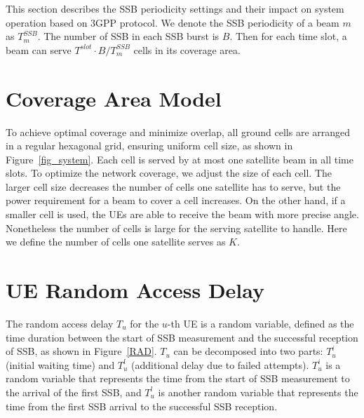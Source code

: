 This section describes the SSB periodicity settings and their impact on system operation based on 3GPP protocol. We denote the SSB periodicity of a beam $m$ as $T^{SSB}_m$. The number of SSB in each SSB burst is $B$. Then for each time slot, a beam can serve $T^{slot} \cdot B / T^{SSB}_m$ cells in its coverage area.

\section{Coverage Area Model}

To achieve optimal coverage and minimize overlap, all ground cells are arranged in a regular hexagonal grid, ensuring uniform cell size, as shown in Figure~\ref{fig_system}. Each cell is served by at most one satellite beam in all time slots. To optimize the network coverage, we adjust the size of each cell. The larger cell size decreases the number of cells one satellite has to serve, but the power requirement for a beam to cover a cell increases. On the other hand, if a smaller cell is used, the UEs are able to receive the beam with more precise angle. Nonetheless the number of cells is large for the serving satellite to handle. Here we define the number of cells one satellite serves as $K$.

\section{UE Random Access Delay}
The random access delay $T_u$ for the $u$-th UE is a random variable, defined as the time duration between the start of SSB measurement and the successful reception of SSB, as shown in Figure~\ref{RAD}. $T_u$ can be decomposed into two parts: $T_u^i$ (initial waiting time) and $T_u^l$ (additional delay due to failed attempts). $T_u^i$ is a random variable that represents the time from the start of SSB measurement to the arrival of the first SSB, and $T_u^l$ is another random variable that represents the time from the first SSB arrival to the successful SSB reception.

